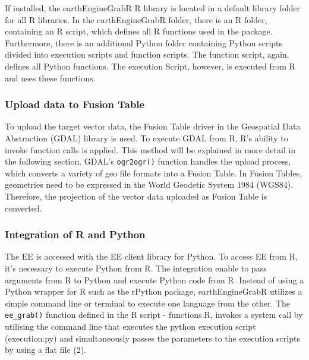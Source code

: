 If installed, the earthEngineGrabR R library is located in a default library folder for all R libraries. In the earthEngineGrabR folder, there is an R folder, containing an R script, which defines all R functions used in the package. Furthermore, there is an additional Python folder containing Python scripts divided into execution scripts and function scripts. The function script, again, defines all Python functions. The execution Script, however, is executed from R and uses these functions.

\subsubsection{Upload data to Fusion Table}

To upload the target vector data, the Fusion Table driver in the Geospatial Data Abstraction (GDAL) library is used. To execute GDAL from R, R's ability to invoke function calls is applied. This method will be explained in more detail in the following section. GDAL's \texttt{ogr2ogr()}  function handles the upload process, which converts a variety of geo file formats into a Fusion Table. In Fusion Tables, geometries need to be expressed in the World Geodetic System 1984 (WGS84). Therefore, the projection of the vector data uploaded as Fusion Table is converted.

\subsubsection{Integration of R and Python}

The EE is accessed with the EE client library for Python. To access EE from R, it's necessary to execute Python from R. The integration enable to pass arguments from R to Python and execute Python code from R. Instead of using a Python wrapper for R such as the rPython package, earthEngineGrabR utilizes a simple command line or terminal to execute one language from the other. The \texttt{ee\_grab()} function defined in the R script - functions.R, invokes a system call by utilising the command line that executes the python execution script (execution.py) and simultaneously passes the parameters to the execution scripts by using a flat file (2). 

